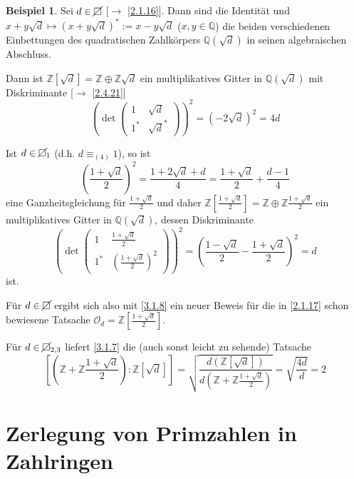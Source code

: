 \documentclass[
twoside=semi,
fontsize=12,
DIV=12, 
cleardoublepage=current,
leqno,
headings=optiontoheadandtoc, 
toc=idx
]{scrbook}
\newcommand{\Z}{\mathbb{Z}}
\newcommand{\Q}{\mathbb{Q}}
\newcommand{\nsquare}{\cancel{\square}}
\newcommand{\brac}[1]{\left( #1 \right)}
\theoremstyle{definition}
\newtheorem{beispiel}[definition]{Beispiel}
\begin{document}
	\begin{beispiel}\label{3.1.9}
		Sei $d \in \nsquare$ [$\to$ \ref{2.1.16}]. Dann sind die Identit\"at und $x+y\sqrt{d} \mapsto (x+y\sqrt{d})^* := x- y \sqrt{d}$ ($x,y \in \Q$) die beiden verschiedenen
		Einbettungen des quadratischen Zahlk\"orpers $\Q(\sqrt{d})$ in seinen algebraischen Abschluss.
		
		Dann ist $\Z[\sqrt{d}] = \Z \oplus \Z\sqrt{d}$ ein multiplikatives Gitter in $\Q(\sqrt{d})$ mit Diskriminante [$\to$ \ref{2.4.21}]
		\[\brac{\det \begin{pmatrix}
				1 & \sqrt{d}\\1^* & \sqrt{d}^*
		\end{pmatrix}}^2 = (-2\sqrt{d})^2 = 4d\]
	
		Ist $d \in \nsquare_1$ (d.h. $d \equiv_{(4)} 1$), so ist 	
			\[\brac{\frac{1+\sqrt{d}}{2}}^2 = \frac{1+2\sqrt{d} + d}{4} = \frac{1+\sqrt{d}}{2} + \frac{d-1}{4}\]
		eine Ganzheitsgleichung f\"ur $\frac{1+\sqrt{d}}{2}$ und daher $\Z[\frac{1+\sqrt{d}}{2}] = \Z \oplus \Z\frac{1+\sqrt{d}}{2}$
		ein multiplikatives Gitter in $\Q(\sqrt{d})$, dessen Diskriminante 
		\[\brac{\det \begin{pmatrix}
				1 & \frac{1+\sqrt{d}}{2} \\ 1^* & \brac{\frac{1+\sqrt{d}}{2}}^2
		\end{pmatrix}}^2 = \brac{\frac{1-\sqrt{d}}{2} - \frac{1+\sqrt{d}  }{2}  }^2 = d\]
		ist.
		
		F\"ur $d \in \nsquare$ ergibt sich also mit \ref{3.1.8} ein neuer Beweis f\"ur die in \ref{2.1.17} schon bewiesene Tatsache
		$\mathcal{O}_d = \Z[\frac{1+\sqrt{d}}{2}]$.
		
		F\"ur $d \in \nsquare_{2,3}$ liefert \ref{3.1.7} die (auch sonst leicht zu sehende) Tatsache 
		\[[(\Z+\Z\frac{1+\sqrt{d}}{2}): \Z[\sqrt{d}]] = \sqrt{\frac{d(\Z[\sqrt{d}])}{d(\Z + \Z\frac{1+\sqrt{d}}{2})}} = \sqrt{\frac{4d}{d}} = 2\]
	\end{beispiel}
	\newpage
	
	\section{Zerlegung von Primzahlen in Zahlringen}
	
\end{document}
